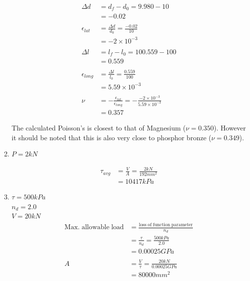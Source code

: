 \documentclass[a4paper,11pt]{article}
\begin{document}
\begin{enumerate}
    \begin{align*}
        \Delta d &=  d_f - d_0 = 9.980 - 10\\
        &= -0.02\\\\
        \epsilon_{lat} &= \frac{\Delta d}{d_0} = \frac{-0.02}{10}\\
        &= -2 \times 10^{-3}\\\\
        \Delta l &=  l_f - l_0 = 100.559 - 100\\
        &= 0.559\\\\
        \epsilon_{long} &= \frac{\Delta l}{l_0} = \frac{0.559}{100}\\
        &= 5.59 \times 10^{-3}\\\\
        \nu &= -\frac{\epsilon_{lat}}{\epsilon_{long}} = -\frac{-2 \times 10^{-3}}{5.59 \times 10^{-3}}\\
        &= 0.357
    \end{align*}

    The calculated Poisson's is closest to that of Magnesium ($\nu = 0.350$). However it should be noted that this is also very close to phosphor bronze ($\nu = 0.349$). 

    \item 
    $P = 2kN$

    \begin{align*}
        \tau_{avg}&= \frac{V}{A} = \frac{2kN}{192mm^2}\\
        &= 10417kPa
    \end{align*}

    
    \item 
    $\tau = 500kPa$\\
    $n_d = 2.0$\\
    $V = 20kN$\\

    \begin{align*}
        \mathrm{Max. \; allowable \; load} &= \frac{\mathrm{loss \; of \; function \; parameter}}{n_d}\\
        &= \frac{\tau}{n_d}  = \frac{500kPa}{2.0}\\
        &= 0.00025GPa\\\\
        A &= \frac{V}{\tau} = \frac{20kN}{0.00025GPa}\\
        &= 80000mm^2
    \end{align*}


\end{enumerate}
\end{document}
